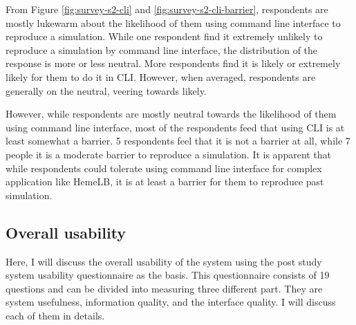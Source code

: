 \vspace{0.5cm}

From Figure \ref{fig:survey-s2-cli} and \ref{fig:survey-s2-cli-barrier}, respondents are mostly lukewarm about the likelihood of them using command line interface to reproduce a simulation. While one respondent find it extremely unlikely to reproduce a simulation by command line interface, the distribution of the response is more or less neutral. More respondents find it is likely or extremely likely for them to do it in CLI. However, when averaged, respondents are generally on the neutral, veering towards likely.

However, while respondents are mostly neutral towards the likelihood of them using command line interface, most of the respondents feed that using CLI is at least somewhat a barrier. 5 respondents feel that it is not a barrier at all, while 7 people it is a moderate barrier to reproduce a simulation. It is apparent that while respondents could tolerate using command line interface for complex application like HemeLB, it is at least a barrier for them to reproduce past simulation. 


\subsection{Overall usability}


Here, I will discuss the overall usability of the system using the post study system usability questionnaire as the basis. This questionnaire consists of 19 questions and can be divided into measuring three different part. They are system usefulness, information quality, and the interface quality. I will discuss each of them in details.

